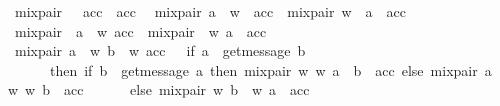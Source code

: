 \begin{isabellebody}
\ {\isachardoublequoteopen}mix{\isacharunderscore}{\kern0pt}pair\ {\isacharbrackleft}{\kern0pt}{\isacharbrackright}{\kern0pt}\ {\isacharbrackleft}{\kern0pt}{\isacharbrackright}{\kern0pt}\ acc\ {\isacharequal}{\kern0pt}\ acc{\isachardoublequoteclose}\ {\isacharbar}{\kern0pt}\isanewline
\ {\isachardoublequoteopen}mix{\isacharunderscore}{\kern0pt}pair\ {\isacharparenleft}{\kern0pt}a\ {\isacharhash}{\kern0pt}\ w{\isacharprime}{\kern0pt}{\isacharparenright}{\kern0pt}\ {\isacharbrackleft}{\kern0pt}{\isacharbrackright}{\kern0pt}\ acc\ {\isacharequal}{\kern0pt}\ mix{\isacharunderscore}{\kern0pt}pair\ w{\isacharprime}{\kern0pt}\ {\isacharbrackleft}{\kern0pt}{\isacharbrackright}{\kern0pt}\ {\isacharparenleft}{\kern0pt}a\ {\isacharhash}{\kern0pt}\ acc{\isacharparenright}{\kern0pt}{\isachardoublequoteclose}\ {\isacharbar}{\kern0pt}\isanewline
\ {\isachardoublequoteopen}mix{\isacharunderscore}{\kern0pt}pair\ {\isacharbrackleft}{\kern0pt}{\isacharbrackright}{\kern0pt}\ {\isacharparenleft}{\kern0pt}a\ {\isacharhash}{\kern0pt}\ w{\isacharparenright}{\kern0pt}\ acc\ {\isacharequal}{\kern0pt}\ mix{\isacharunderscore}{\kern0pt}pair\ {\isacharbrackleft}{\kern0pt}{\isacharbrackright}{\kern0pt}\ w\ {\isacharparenleft}{\kern0pt}a\ {\isacharhash}{\kern0pt}\ acc{\isacharparenright}{\kern0pt}{\isachardoublequoteclose}\ {\isacharbar}{\kern0pt}\isanewline
\ {\isachardoublequoteopen}mix{\isacharunderscore}{\kern0pt}pair\ {\isacharparenleft}{\kern0pt}a\ {\isacharhash}{\kern0pt}\ w{\isacharprime}{\kern0pt}{\isacharparenright}{\kern0pt}\ {\isacharparenleft}{\kern0pt}b\ {\isacharhash}{\kern0pt}\ w{\isacharparenright}{\kern0pt}\ acc\ \ {\isacharequal}{\kern0pt}\ {\isacharparenleft}{\kern0pt}if\ a\ {\isacharequal}{\kern0pt}\ {\isacharbang}{\kern0pt}{\isasymlangle}get{\isacharunderscore}{\kern0pt}message\ b{\isasymrangle}\isanewline
\ \ \ \ \ \ then\ {\isacharparenleft}{\kern0pt}if\ b\ {\isacharequal}{\kern0pt}\ {\isacharquery}{\kern0pt}{\isasymlangle}get{\isacharunderscore}{\kern0pt}message\ a{\isasymrangle}\ then\ mix{\isacharunderscore}{\kern0pt}pair\ w{\isacharprime}{\kern0pt}\ w\ {\isacharparenleft}{\kern0pt}a\ {\isacharhash}{\kern0pt}\ b\ {\isacharhash}{\kern0pt}\ acc{\isacharparenright}{\kern0pt}\ else\ mix{\isacharunderscore}{\kern0pt}pair\ {\isacharparenleft}{\kern0pt}a\ {\isacharhash}{\kern0pt}\ w{\isacharprime}{\kern0pt}{\isacharparenright}{\kern0pt}\ w\ {\isacharparenleft}{\kern0pt}b\ {\isacharhash}{\kern0pt}\ acc{\isacharparenright}{\kern0pt}{\isacharparenright}{\kern0pt}\isanewline
\ \ \ \ \ \ else\ mix{\isacharunderscore}{\kern0pt}pair\ w{\isacharprime}{\kern0pt}\ {\isacharparenleft}{\kern0pt}b\ {\isacharhash}{\kern0pt}\ w{\isacharparenright}{\kern0pt}\ {\isacharparenleft}{\kern0pt}a\ {\isacharhash}{\kern0pt}\ acc{\isacharparenright}{\kern0pt}{\isacharparenright}{\kern0pt}{\isachardoublequoteclose}\isanewline

\end{isabellebody}
